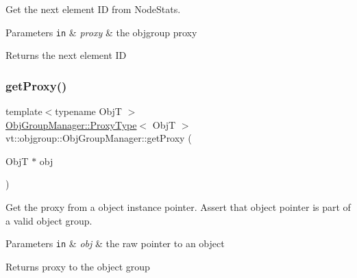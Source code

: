 Get the next element ID from {\ttfamily Node\+Stats}. 


\begin{DoxyParams}[1]{Parameters}
\mbox{\tt in}  & {\em proxy} & the objgroup proxy\\
\hline
\end{DoxyParams}
\begin{DoxyReturn}{Returns}
the next element ID 
\end{DoxyReturn}
\mbox{\label{structvt_1_1objgroup_1_1_obj_group_manager_a9758d68a4656e7ff2eb1ac07b4feeeed}} 
\subsubsection{\texorpdfstring{get\+Proxy()}{getProxy()}\hspace{0.1cm}{\footnotesize\ttfamily [1/2]}}
{\footnotesize\ttfamily template$<$typename ObjT $>$ \\
\hyperlink{structvt_1_1objgroup_1_1_obj_group_manager_aea65eef52f240a52210132eef5ce591f}{Obj\+Group\+Manager\+::\+Proxy\+Type}$<$ ObjT $>$ vt\+::objgroup\+::\+Obj\+Group\+Manager\+::get\+Proxy (\begin{DoxyParamCaption}\item[{ObjT $\ast$}]{obj }\end{DoxyParamCaption})}



Get the proxy from a object instance pointer. Assert that object pointer is part of a valid object group. 


\begin{DoxyParams}[1]{Parameters}
\mbox{\tt in}  & {\em obj} & the raw pointer to an object\\
\hline
\end{DoxyParams}
\begin{DoxyReturn}{Returns}
proxy to the object group 
\end{DoxyReturn}
\mbox{\label{structvt_1_1objgroup_1_1_obj_group_manager_a9569c5ad1c032a90573bd987c64f560a}} 

